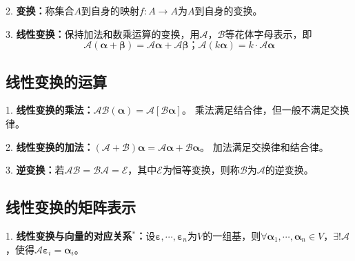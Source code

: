 2. \textbf{变换：}称集合$A$到自身的映射$f:A\rightarrow A$为$A$到自身的变换。

3. \textbf{线性变换：}保持加法和数乘运算的变换，用$\mathscr{A}$，$\mathscr{B}$等花体字母表示，即
\begin{equation*}
    \mathscr{A}(\boldsymbol{\alpha}+\boldsymbol{\beta})=\mathscr{A}\boldsymbol{\alpha}+\mathscr{A}\boldsymbol{\beta}\text{；}\mathscr{A}(k\boldsymbol{\alpha})=k\cdot \mathscr{A}\boldsymbol{\alpha}
\end{equation*}

\subsection{线性变换的运算}

1. \textbf{线性变换的乘法：}$\mathscr{A}\mathscr{B}(\boldsymbol{\alpha})=\mathscr{A}\left[\mathscr{B}\boldsymbol{\alpha}\right]$。
乘法满足结合律，但一般不满足交换律。

2. \textbf{线性变换的加法：}$(\mathscr{A}+\mathscr{B})\boldsymbol{\alpha}=\mathscr{A}\boldsymbol{\alpha}+\mathscr{B}\boldsymbol{\alpha}$。
加法满足交换律和结合律。

3. \textbf{逆变换：}若$\mathscr{A}\mathscr{B}=\mathscr{B}\mathscr{A}=\mathscr{E}$，其中$\mathscr{E}$为恒等变换，则称$\mathscr{B}$为$\mathscr{A}$的逆变换。

\subsection{线性变换的矩阵表示}

1. \textbf{线性变换与向量的对应关系$^*$：}设$\boldsymbol{\varepsilon},\cdots,\boldsymbol{\varepsilon}_n$为$V$的一组基，则$\forall \boldsymbol{\alpha}_1,\cdots,\boldsymbol{\alpha}_n \in V$，$\exists !\mathscr{A}$，使得$\mathscr{A}\boldsymbol{\varepsilon}_i=\boldsymbol{\alpha}_i$。

